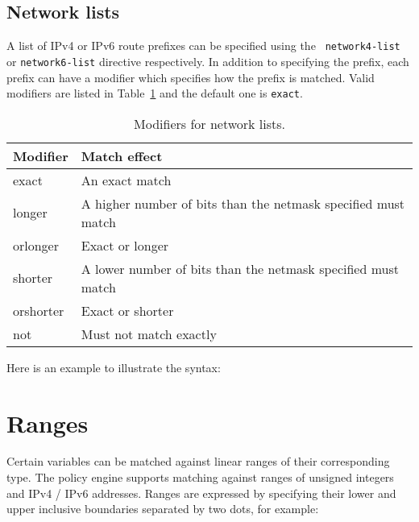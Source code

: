\subsection{Network lists}
A list of IPv4 or IPv6 route prefixes can be specified using the {\tt
network4-list} or {\tt network6-list} directive respectively.  In addition to
specifying the prefix, each prefix can have a modifier which specifies how the
prefix is matched.  Valid modifiers are listed in Table~\ref{tab:policy:mod} and
the default one is {\tt exact}.
\begin{table}
\begin{center}
\begin{tabular}{|l|l|}
\hline
Modifier  & Match effect \\
\hline\hline
exact	  & An exact match \\
\hline
longer	  & A higher number of bits than the netmask specified must match \\
\hline
orlonger  & Exact or longer \\
\hline
shorter	  & A lower number of bits than the netmask specified must match \\
\hline
orshorter & Exact or shorter \\
\hline
not	  & Must not match exactly \\
\hline
\end{tabular}
\end{center}
\caption{\label{tab:policy:mod}Modifiers for network lists.}
\end{table}

Here is an example to illustrate the syntax:

\noindent{}

\section{Ranges}
Certain variables can be matched against linear ranges of their corresponding type.
The policy engine supports matching against ranges of unsigned integers and IPv4 / IPv6 addresses.
Ranges are expressed by specifying their lower and upper inclusive boundaries separated by two dots, for example:


